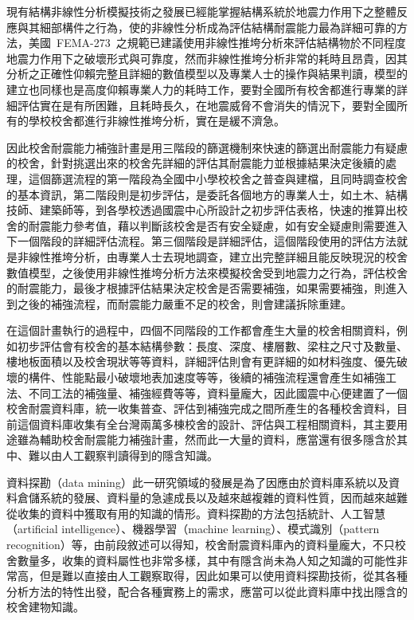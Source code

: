 現有結構非線性分析模擬技術之發展已經能掌握結構系統於地震力作用下之整體反應與其細部構件之行為，使的非線性分析成為評估結構耐震能力最為詳細可靠的方法，美國~FEMA-273\cite{building1997nehrp}~之規範已建議使用非線性推垮分析來評估結構物於不同程度地震力作用下之破壞形式與可靠度，然而非線性推垮分析非常的耗時且昂貴，因其分析之正確性仰賴完整且詳細的數值模型以及專業人士的操作與結果判讀，模型的建立也同樣也是高度仰賴專業人力的耗時工作，要對全國所有校舍都進行專業的詳細評估實在是有所困難，且耗時長久，在地震威脅不會消失的情況下，要對全國所有的學校校舍都進行非線性推垮分析，實在是緩不濟急。

因此校舍耐震能力補強計畫是用三階段的篩選機制來快速的篩選出耐震能力有疑慮的校舍，針對挑選出來的校舍先詳細的評估其耐震能力並根據結果決定後續的處理，這個篩選流程的第一階段為全國中小學校校舍之普查與建檔，且同時調查校舍的基本資訊，第二階段則是初步評估，是委託各個地方的專業人士，如土木、結構技師、建築師等，到各學校透過國震中心所設計之初步評估表格，快速的推算出校舍的耐震能力參考值，藉以判斷該校舍是否有安全疑慮，如有安全疑慮則需要進入下一個階段的詳細評估流程。第三個階段是詳細評估，這個階段使用的評估方法就是非線性推垮分析，由專業人士去現地調查，建立出完整詳細且能反映現況的校舍數值模型，之後使用非線性推垮分析方法來模擬校舍受到地震力之行為，評估校舍的耐震能力，最後才根據評估結果決定校舍是否需要補強，如果需要補強，則進入到之後的補強流程，而耐震能力嚴重不足的校舍，則會建議拆除重建。

在這個計畫執行的過程中，四個不同階段的工作都會產生大量的校舍相關資料，例如初步評估會有校舍的基本結構參數：長度、深度、樓層數、梁柱之尺寸及數量、樓地板面積以及校舍現狀等等資料，詳細評估則會有更詳細的如材料強度、優先破壞的構件、性能點最小破壞地表加速度等等，後續的補強流程還會產生如補強工法、不同工法的補強量、補強經費等等，資料量龐大，因此國震中心便建置了一個校舍耐震資料庫，統一收集普查、評估到補強完成之間所產生的各種校舍資料，目前這個資料庫收集有全台灣兩萬多棟校舍的設計、評估與工程相關資料，其主要用途雖為輔助校舍耐震能力補強計畫，然而此一大量的資料，應當還有很多隱含於其中、難以由人工觀察判讀得到的隱含知識。

資料探勘（data mining）此一研究領域的發展是為了因應由於資料庫系統以及資料倉儲系統的發展、資料量的急遽成長以及越來越複雜的資料性質，因而越來越難從收集的資料中獲取有用的知識的情形。資料探勘的方法包括統計、人工智慧（artificial intelligence）、機器學習（machine learning）、模式識別（pattern recognition）等，由前段敘述可以得知，校舍耐震資料庫內的資料量龐大，不只校舍數量多，收集的資料屬性也非常多樣，其中有隱含尚未為人知之知識的可能性非常高，但是難以直接由人工觀察取得，因此如果可以使用資料探勘技術，從其各種分析方法的特性出發，配合各種實務上的需求，應當可以從此資料庫中找出隱含的校舍建物知識。

